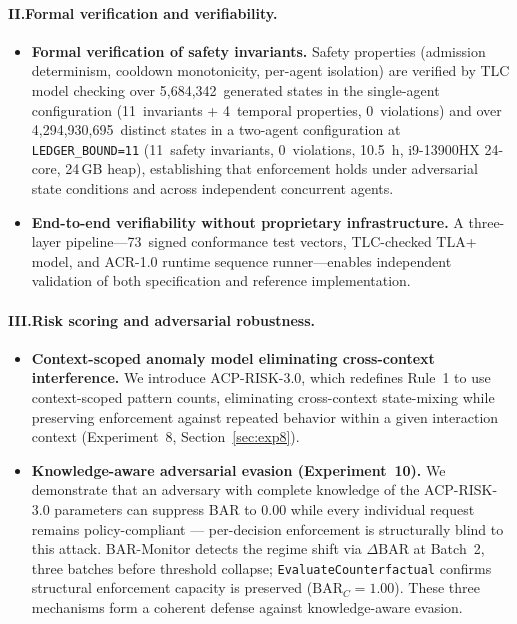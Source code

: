 \documentclass[11pt]{article}
\theoremstyle{definition}
\begin{document}
\paragraph{II.\enspace Formal verification and verifiability.}
\begin{itemize}[noitemsep]
  \item \textbf{Formal verification of safety invariants.} Safety properties
    (admission determinism, cooldown monotonicity, per-agent isolation) are
    verified by TLC model checking over 5,684,342~generated states in the
    single-agent configuration (11~invariants + 4~temporal properties, 0~violations)
    and over 4,294,930,695~distinct states in a two-agent configuration
    at \texttt{LEDGER\_BOUND=11} (11~safety invariants, 0~violations, 10.5~h,
    i9-13900HX 24-core, 24\,GB heap), establishing that enforcement holds under
    adversarial state conditions and across independent concurrent agents.
  \item \textbf{End-to-end verifiability without proprietary infrastructure.}
    A three-layer pipeline---73~signed conformance test vectors, TLC-checked
    TLA+ model, and ACR-1.0 runtime sequence runner---enables independent
    validation of both specification and reference implementation.
\end{itemize}

\paragraph{III.\enspace Risk scoring and adversarial robustness.}
\begin{itemize}[noitemsep]
  \item \textbf{Context-scoped anomaly model eliminating cross-context interference.}
    We introduce ACP-RISK-3.0, which redefines Rule~1 to use context-scoped
    pattern counts, eliminating cross-context state-mixing while preserving
    enforcement against repeated behavior within a given interaction context
    (Experiment~8, Section~\ref{sec:exp8}).
  \item \textbf{Knowledge-aware adversarial evasion (Experiment~10).}
    We demonstrate that an adversary with complete knowledge of the ACP-RISK-3.0
    parameters can suppress BAR to $0.00$ while every individual request remains
    policy-compliant --- per-decision enforcement is structurally blind to this attack.
    BAR-Monitor detects the regime shift via $\Delta\mathrm{BAR}$ at Batch~2, three
    batches before threshold collapse; \texttt{EvaluateCounterfactual} confirms
    structural enforcement capacity is preserved ($\mathrm{BAR}_C = 1.00$).
    These three mechanisms form a coherent defense against knowledge-aware evasion.
\end{itemize}
\end{document}
